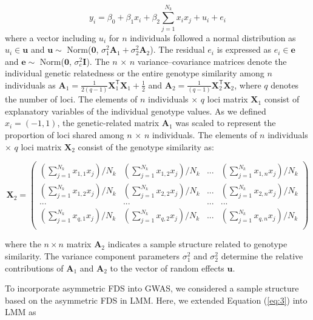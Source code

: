 \documentclass[12pt,]{article}
\begin{document}
\begin{equation}
y_i = \beta_0 + \beta_1x_i + \beta_2\sum^{N_{k}}_{j=1}{x_ix_j} + u_i + e_i \label{eq:s1}
\end{equation}
\noindent
where a vector including $u_i$ for $n$ individuals followed a normal distribution as $u_i \in \mathbf{u}$ and $\mathbf{u} \sim$ Norm($\mathbf{0}$, $\sigma^2_1\mathbf{A}_1+\sigma^2_2\mathbf{A}_2$). The residual $e_i$ is expressed as $e_i \in \mathbf{e}$ and $\mathbf{e} \sim$ Norm($\mathbf{0}$, $\sigma^2_e\mathbf{I}$).
The $n$ × $n$ variance–covariance matrices denote the individual genetic relatedness or the entire genotype similarity among $n$ individuals as
$\mathbf{A}_1=\frac{1}{2(q-1)}\mathbf{X}_1^\mathsf{T}\mathbf{X}_1 + \frac{1}{2}$ and 
$\mathbf{A}_2=\frac{1}{(q-1)}\mathbf{X}_2^\mathsf{T} \mathbf{X}_2$,
where $q$ denotes the number of loci. The elements of $n$ individuals $\times$ $q$ loci matrix $\mathbf{X}_1$ consist of explanatory variables of the individual genotype values. As we defined $x_i = (-1, 1)$, the genetic-related matrix $\mathbf{A}_1$ was scaled to represent the proportion of loci shared among $n$ × $n$ individuals. The elements of $n$ individuals $\times$ $q$ loci matrix $\mathbf{X}_2$ consist of the genotype similarity as:

$$\mathbf{X}_2=\left(\begin{array}{cccc}
    (\sum^{N_k}_{j=1}x_{1,1} x_j)/N_k &  (\sum^{N_k}_{j=1}x_{1,2} x_j)/N_k &  ... &  (\sum^{N_k}_{j=1}x_{1,n} x_j)/N_k \\ 
    (\sum^{N_k}_{j=1}x_{1,2} x_j)/N_k &  (\sum^{N_k}_{j=1}x_{2,2} x_j)/N_k &  ... &  (\sum^{N_k}_{j=1}x_{2,n} x_j)/N_k\\
    ... & ... & ... & ... \\
    (\sum^{N_k}_{j=1}x_{q,1} x_j)/N_k &  (\sum^{N_k}_{j=1}x_{q,2} x_j)/N_k &  ... &  (\sum^{N_k}_{j=1}x_{q,n} x_j)/N_k \\
    \end{array} \right)
$$

\noindent
where the $n \times n$ matrix $\mathbf{A}_2$ indicates a sample structure related to genotype similarity. The variance component parameters $\sigma^2_1$ and $\sigma^2_2$ determine the relative contributions of $\mathbf{A}_1$ and $\mathbf{A}_2$ to the vector of random effects $\mathbf{u}$.

To incorporate asymmetric FDS into GWAS, we considered a sample structure based on the asymmetric FDS in LMM. Here, we extended Equation (\ref{eq:3}) into LMM as
\end{document}
